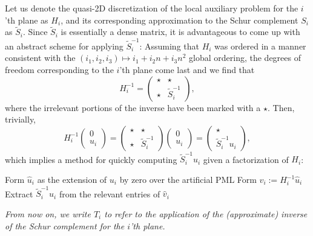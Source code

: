 Let us denote the quasi-2D discretization of the local auxiliary problem for
the $i$'th plane as $H_i$, and its corresponding approximation to the Schur 
complement $S_i$ as $\tilde S_i$. Since $\tilde S_i$ is essentially a dense 
matrix, it is advantageous to come up with 
an abstract scheme for applying $\tilde S_i^{-1}$: Assuming that $H_i$ was 
ordered in a manner consistent with the 
$(i_1,i_2,i_3) \mapsto i_1+i_2 n+i_3 n^2$ global ordering, the degrees of 
freedom corresponding to the $i$'th plane come last and we find that
\begin{equation}
  H_i^{-1}=\left(\begin{array}{cc} \star & \star \\ \star & \tilde S_i^{-1}
           \end{array}\right),
\end{equation}
where the irrelevant portions of the inverse have been marked with a $\star$.
Then, trivially,
\begin{equation}
  H_i^{-1} \left(\begin{array}{c}0\\ u_i\end{array}\right)= 
  \left(\begin{array}{cc}\star &\star\\ \star &\tilde S_i^{-1}\end{array}\right)
  \left(\begin{array}{c}0\\ u_i\end{array}\right)= 
  \left(\begin{array}{c}\star\\ \tilde S_i^{-1}u_i\end{array}\right),
\end{equation}
which implies a method for quickly computing $\tilde S_i^{-1} u_i$ given 
a factorization of $H_i$:

\begin{algorithm}
\DontPrintSemicolon
Form $\hat u_i$ as the extension of $u_i$ by zero over the artificial PML\;
Form $\hat v_i := H_i^{-1} \hat u_i$\;
Extract $\tilde S_i^{-1} u_i$ from the relevant entries of $\hat v_i$\;
\caption{Application of $\tilde S_i^{-1}$ to $u_i$ given a multifrontal
factorization of $H_i$. $O(\gamma^2 n^2 \log n)$ work is required.}
\label{alg:apply-inverse}
\end{algorithm}
{\em From now on, we write $T_i$ to refer to the application of the 
(approximate) inverse of the Schur complement for the $i$'th plane.} 

